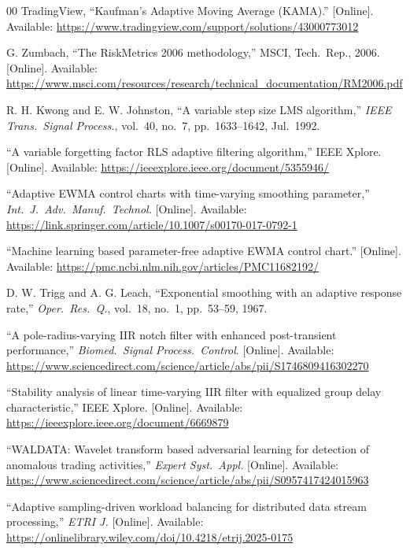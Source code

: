 \documentclass[conference]{IEEEtran}
\begin{document}
\begin{thebibliography}{00}
 TradingView, ``Kaufman's Adaptive Moving Average (KAMA).''
  [Online]. Available: \url{https://www.tradingview.com/support/solutions/43000773012}

 G. Zumbach, ``The RiskMetrics 2006 methodology,''
  MSCI, Tech.\ Rep., 2006. [Online]. Available:
  \url{https://www.msci.com/resources/research/technical_documentation/RM2006.pdf}

 R. H. Kwong and E. W. Johnston, ``A variable step size LMS
  algorithm,'' \emph{IEEE Trans.\ Signal Process.}, vol.~40, no.~7,
  pp.~1633--1642, Jul.\ 1992.

 ``A variable forgetting factor RLS adaptive filtering
  algorithm,'' IEEE Xplore. [Online]. Available:
  \url{https://ieeexplore.ieee.org/document/5355946/}

 ``Adaptive EWMA control charts with time-varying smoothing
  parameter,'' \emph{Int.\ J.\ Adv.\ Manuf.\ Technol.} [Online]. Available:
  \url{https://link.springer.com/article/10.1007/s00170-017-0792-1}

 ``Machine learning based parameter-free adaptive EWMA
  control chart.'' [Online]. Available:
  \url{https://pmc.ncbi.nlm.nih.gov/articles/PMC11682192/}

 D. W. Trigg and A. G. Leach, ``Exponential smoothing
  with an adaptive response rate,'' \emph{Oper.\ Res.\ Q.}, vol.~18, no.~1,
  pp.~53--59, 1967.

 ``A pole-radius-varying IIR notch filter with enhanced
  post-transient performance,'' \emph{Biomed.\ Signal Process.\ Control}.
  [Online]. Available:
  \url{https://www.sciencedirect.com/science/article/abs/pii/S1746809416302270}

 ``Stability analysis of linear time-varying IIR filter with
  equalized group delay characteristic,'' IEEE Xplore. [Online]. Available:
  \url{https://ieeexplore.ieee.org/document/6669879}

 ``WALDATA: Wavelet transform based adversarial learning for
  detection of anomalous trading activities,'' \emph{Expert Syst.\ Appl.}
  [Online]. Available:
  \url{https://www.sciencedirect.com/science/article/abs/pii/S0957417424015963}

 ``Adaptive sampling-driven workload balancing for distributed
  data stream processing,'' \emph{ETRI J.} [Online]. Available:
  \url{https://onlinelibrary.wiley.com/doi/10.4218/etrij.2025-0175}


\end{thebibliography}
\end{document}
